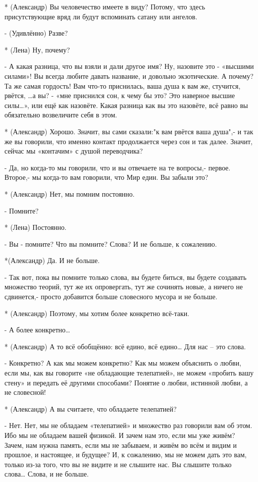 * (Александр) Вы человечество имеете в виду?  Потому, что здесь присутствующие вряд ли будут вспоминать сатану или ангелов.

- (Удивлённо) Разве?

* (Лена) Ну, почему? 

- А какая разница, что вы взяли и дали другое имя? Ну, назовите это - «высшими силами»! Вы всегда любите давать название, и довольно экзотические. А почему? Та же самая гордость! Вам что-то приснилась, ваша душа к вам же, стучится, рвётся, …а  вы? - «мне приснился сон, к чему бы это? Это наверное высшие силы…», или ещё как назовёте. Какая разница как вы это назовёте, всё равно вы обязательно возвеличите себя в этом.

* (Александр) Хорошо. Значит, вы сами сказали:"к вам рвётся ваша душа",- и так же вы говорили, что именно контакт продолжается через сон и так далее. Значит, сейчас мы  «контачим» с душой переводчика?

- Да, но когда-то мы говорили, что и вы отвечаете на те вопросы,- первое. Второе,- мы когда-то вам говорили, что Мир един. Вы забыли это?

* (Александр) Нет, мы помним постоянно.

- Помните?

* (Лена) Постоянно.

- Вы - помните? Что вы помните? Слова? И не больше, к сожалению.

*(Александр) Да. И не больше.

- Так вот, пока вы помните только слова, вы будете биться, вы будете создавать множество теорий, тут же их опровергать, тут же сочинять новые, а ничего не сдвинется,- просто добавится больше словесного мусора и не больше.

* (Александр) Поэтому, мы хотим более конкретно всё-таки. 

-  А более конкретно…

* (Александр) А то всё обобщённо: всё едино, всё едино… Для нас – это слова.

-  Конкретно? А как мы можем конкретно? Как мы можем объяснить о любви, если мы, как вы говорите «не обладающие телепатией», не можем «пробить вашу стену» и передать её другими способами? Понятие о любви, истинной любви, а не словесной!

* (Александр) А вы считаете, что обладаете телепатией?

- Нет. Нет, мы не обладаем «телепатией» и множество раз говорили вам об этом. Ибо мы не обладаем вашей физикой. И зачем нам это, если мы уже живём?  Зачем, нам нужна память, если мы не забываем, и живём во всём и видим и прошлое, и настоящее, и будущее? И, к сожалению, мы не можем дать это вам, только из-за того, что вы не видите и не слышите нас. Вы слышите только слова… Слова, и не больше.

